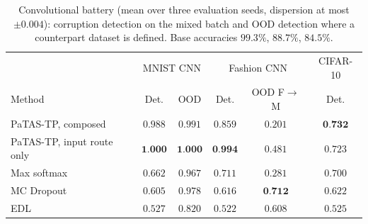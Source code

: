 \begin{table}[ht]
\centering
\begin{tabular}{lccccc}
\hline
 & \multicolumn{2}{c}{MNIST \ac{CNN}} & \multicolumn{2}{c}{Fashion \ac{CNN}} & CIFAR-10 \\
Method & Det. & OOD & Det. & OOD F$\to$M & Det. \\
\hline
\ac{PaTAS-TP}, composed & $0.988$ & $0.991$ & $0.859$ & $0.201$ & $\textbf{0.732}$ \\
\ac{PaTAS-TP}, input route only & $\textbf{1.000}$ & $\textbf{1.000}$ & $\textbf{0.994}$ & $0.481$ & $0.723$ \\
Max softmax & $0.662$ & $0.967$ & $0.711$ & $0.281$ & $0.700$ \\
MC Dropout & $0.605$ & $0.978$ & $0.616$ & $\textbf{0.712}$ & $0.622$ \\
\ac{EDL} & $0.527$ & $0.820$ & $0.522$ & $0.608$ & $0.525$ \\
\hline
\end{tabular}
\caption{Convolutional battery (mean over three evaluation seeds, dispersion at most $\pm 0.004$): corruption detection on the mixed batch and \ac{OOD} detection where a counterpart dataset is defined. Base accuracies $99.3\%$, $88.7\%$, $84.5\%$.}
\label{tab:diss-conv}
\end{table}

